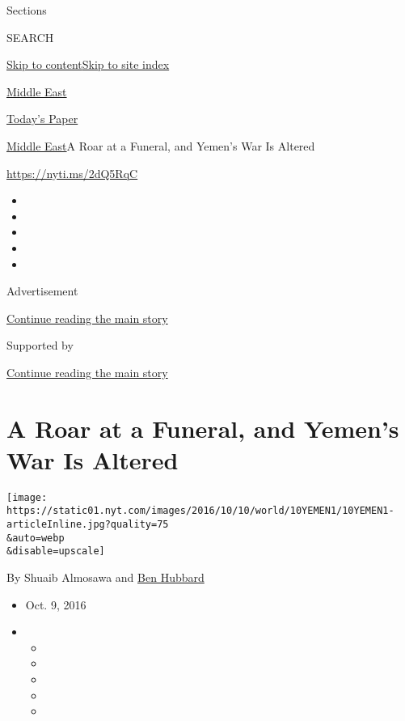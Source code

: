 Sections

SEARCH

\protect\hyperlink{site-content}{Skip to
content}\protect\hyperlink{site-index}{Skip to site index}

\href{https://www.nytimes.com/section/world/middleeast}{Middle East}

\href{https://myaccount.nytimes.com/auth/login?response_type=cookie\&client_id=vi}{}

\href{https://www.nytimes.com/section/todayspaper}{Today's Paper}

\href{/section/world/middleeast}{Middle East}\textbar{}A Roar at a
Funeral, and Yemen's War Is Altered

\url{https://nyti.ms/2dQ5RqC}

\begin{itemize}
\item
\item
\item
\item
\item
\end{itemize}

Advertisement

\protect\hyperlink{after-top}{Continue reading the main story}

Supported by

\protect\hyperlink{after-sponsor}{Continue reading the main story}

\hypertarget{a-roar-at-a-funeral-and-yemens-war-is-altered}{%
\section{A Roar at a Funeral, and Yemen's War Is
Altered}\label{a-roar-at-a-funeral-and-yemens-war-is-altered}}

\texttt{[image: https://static01.nyt.com/images/2016/10/10/world/10YEMEN1/10YEMEN1-articleInline.jpg?quality=75\\\&auto=webp\\\&disable=upscale]}

By Shuaib Almosawa and \href{http://www.nytimes.com/by/ben-hubbard}{Ben
Hubbard}

\begin{itemize}
\item
  Oct. 9, 2016
\item
  \begin{itemize}
  \item
  \item
  \item
  \item
  \item
  \end{itemize}
\end{itemize}


